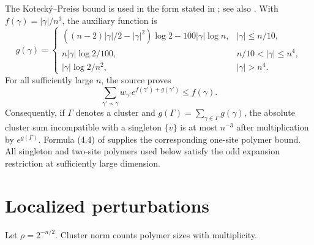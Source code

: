 \documentclass[11pt]{article}
\theoremstyle{remark}\newtheorem{remark}[theorem]{Remark}
\begin{document}
The Koteck\'{y}--Preiss bound is used in the form stated in
\cite[Theorem 2.2]{JMP}; see also \cite{KP}. With
$f(\gamma)=|\gamma|/n^3$, the auxiliary function is
\begin{equation}\label{eq:g}
 g(\gamma)=\begin{cases}
 ((n-2)|\gamma|/2-|\gamma|^2)\log2-100|\gamma|\log n,
       &|\gamma|\le n/10,\\
 n|\gamma|\log2/100,&n/10<|\gamma|\le n^4,\\
 |\gamma|\log2/n^2,&|\gamma|>n^4.
 \end{cases}
\end{equation}
For all sufficiently large $n$, the source proves
\begin{equation}\label{eq:KP}
 \sum_{\gamma'\not\sim\gamma}
 w_{\gamma'}e^{f(\gamma')+g(\gamma')}\le f(\gamma).
\end{equation}
Consequently, if $\Gamma$ denotes a cluster and
$g(\Gamma)=\sum_{\gamma\in\Gamma}g(\gamma)$, the absolute cluster sum
incompatible with a singleton $\{v\}$ is at most $n^{-3}$ after
multiplication by $e^{g(\Gamma)}$. Formula (4.4) of \cite{JMP} supplies
the corresponding one-site polymer bound. All singleton and two-site
polymers used below satisfy the odd expansion restriction at sufficiently
large dimension.

\section{Localized perturbations}\label{sec:local}
Let $\rho=2^{-n/2}$. Cluster norm counts polymer sizes with multiplicity.
\end{document}
